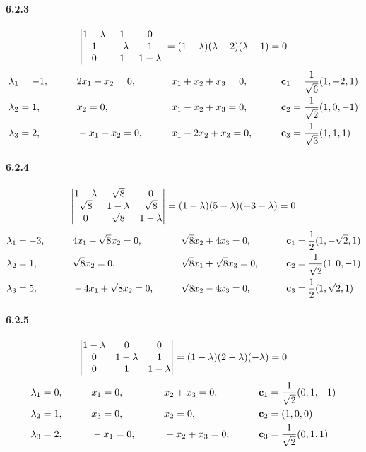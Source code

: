 \documentclass[a4paper]{article}
\begin{document}
\paragraph{6.2.3}
\[
\begin{vmatrix}
1-\lambda&1&0\\
1&-\lambda&1\\
0&1&1-\lambda
\end{vmatrix}=
(1-\lambda)(\lambda-2)(\lambda+1)=0
\]
\begin{alignat*}{4}
    & \lambda_1=-1,\qquad && 2x_1+x_2=0,\qquad && x_1+x_2+x_3=0,\qquad && \mathbf{c}_1=\frac{1}{\sqrt{6}}(1,-2,1)\\
    & \lambda_2=1,\qquad && x_2=0,\qquad && x_1-x_2+x_3=0,\qquad && \mathbf{c}_2=\frac{1}{\sqrt{2}}(1,0,-1)\\
    & \lambda_3=2,\qquad && -x_1+x_2=0,\qquad && x_1-2 x_2+x_3=0,\qquad && \mathbf{c}_3=\frac{1}{\sqrt{3}}(1,1,1)\\
\end{alignat*}

\paragraph{6.2.4}
\[
\begin{vmatrix}
 1-\lambda&\sqrt{8} &0 \\
 \sqrt{8}& 1-\lambda&\sqrt{8} \\
0 &\sqrt{8} & 1-\lambda
\end{vmatrix}=
(1-\lambda)(5-\lambda)(-3-\lambda)=0
\]
\begin{alignat*}{4}
    & \lambda_1=-3 ,\qquad && 4x_1+\sqrt{8}x_2=0,\qquad && \sqrt{8}x_2+4x_3=0,\qquad && \mathbf{c}_1=\frac{1}{2}(1,-\sqrt{2},1)\\
    & \lambda_2=1 ,\qquad && \sqrt{8}x_2=0,\qquad && \sqrt{8}x_1+\sqrt{8}x_3=0,\qquad && \mathbf{c}_2=\frac{1}{\sqrt{2}}(1,0,-1)\\
    & \lambda_3=5 ,\qquad && -4x_1+\sqrt{8}x_2=0,\qquad && \sqrt{8}x_2-4x_3=0,\qquad && \mathbf{c}_3=\frac{1}{2}(1,\sqrt{2},1)\\
\end{alignat*}

\paragraph{6.2.5}
\[
\begin{vmatrix}
 1-\lambda& 0& 0\\
 0& 1-\lambda&1 \\
 0& 1& 1-\lambda
\end{vmatrix}=
(1-\lambda)(2-\lambda)(-\lambda)=0
\]
\begin{alignat*}{4}
    & \lambda_1=0 ,\qquad && x_1=0,\qquad && x_2+x_3=0,\qquad && \mathbf{c}_1=\frac{1}{\sqrt{2}}(0,1,-1)\\
    & \lambda_2=1 ,\qquad && x_3=0,\qquad && x_2=0,\qquad && \mathbf{c}_2=(1,0,0)\\
    & \lambda_3=2 ,\qquad && -x_1=0,\qquad && -x_2+x_3=0,\qquad && \mathbf{c}_3=\frac{1}{\sqrt{2}}(0,1,1)\\
\end{alignat*}
\end{document}

